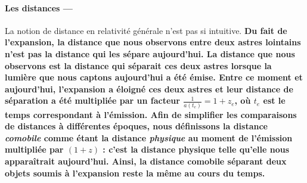 \documentclass[11pt, twoside, a4paper, openright]{report}
\begin{document}


\paragraph{Les distances —}
La notion de distance en relativité générale n'est pas si intuitive.
\textbf{Du fait de l'expansion, la distance que nous observons entre deux astres lointains n'est pas la distance qui les sépare aujourd'hui. La distance que nous observons est la distance qui séparait ces deux astres lorsque la lumière que nous captons aujourd'hui a été émise. Entre ce moment et aujourd'hui, l'expansion a éloigné ces deux astres et leur distance de séparation a été multipliée par un facteur $\frac{1}{a(t_e)} = 1 + z_{e}$, où $t_e$ est le temps correspondant à l'émission. Afin de simplifier les comparaisons de distances à différentes époques, nous définissons la distance \emph{comobile} comme étant la distance \emph{physique} au moment de l'émission multipliée par $(1+z)$ : c'est la distance physique telle qu'elle nous apparaîtrait aujourd'hui. Ainsi, la distance comobile séparant deux objets soumis à l'expansion reste la même au cours du temps.}
\end{document}
